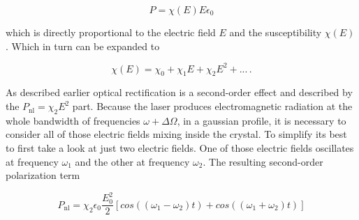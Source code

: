 \begin{equation}
P = \chi(E) E \epsilon_0
\end{equation}

which is directly proportional to the electric field $E$ and the susceptibility $\chi(E)$.
Which in turn can be expanded to 

\begin{equation}
    \chi(E) = \chi_0 + \chi_1 E +\chi_2 E^2 + ...   \, .
\end{equation}

As described earlier optical rectification is a second-order effect and described by the $P_\text{nl} = \chi_2 E^2$ part.
Because the laser produces electromagnetic radiation at the whole bandwidth of frequencies $\omega + \Delta\Omega$, in a gaussian profile, it is necessary to consider all of those electric fields mixing inside the crystal.
To simplify its best to first take a look at just two electric fields.
One of those electric fields oscillates at frequency $\omega_1$ and the other at frequency $\omega_2$.
The resulting second-order polarization term 

\begin{equation}
    P_\text{nl} = \chi_2 \epsilon_0 \frac{E_0^2}{2}\left[cos((\omega_1 - \omega_2)t) + cos((\omega_1 + \omega_2)t)\right]
\label{eq:two_freq_mixing}
\end{equation}

